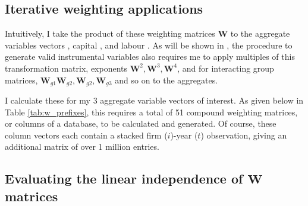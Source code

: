 \subsection{Iterative weighting applications}
\label{ss:data-matrix-weights}

Intuitively, I take the product of these weighting matrices $\mathbf W$ to the aggregate variables vectors
, capital , and labour .
As will be shown in , the procedure to generate valid instrumental variables
also requires me to apply multiples of this transformation matrix,
exponents $\mathbf W^2, \mathbf W^3, \mathbf W^4$, and for interacting group matrices,
$\mathbf W_{g1}\mathbf W_{g2}, \mathbf W_{g2}, \mathbf W_{g3}$ and so on to the aggregates.
\par
I calculate these for my 3 aggregate variable vectors of interest.
As given below in Table \ref{tab:w_prefixes}, this requires a total of 51 compound weighting matrices,
or columns of a database, to be calculated and generated.
Of course, these column vectors each contain a stacked firm ($i$)-year ($t$)
observation, giving an additional matrix of over 1 million entries.

\subsection{Evaluating the linear independence of $\mathbf W$ matrices}

